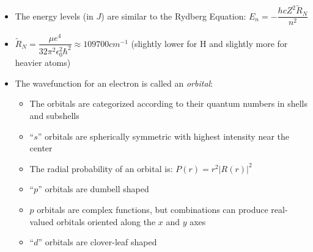 \documentclass[12pt, openany, letterpaper]{memoir}
\begin{document}
\begin{itemize}
\begin{itemize}
	\end{itemize}
	\item The energy levels (in $J$) are similar to the Rydberg Equation: $E_n = -\dfrac{hcZ^2\tilde{R}_N}{n^2}$
	\item $\tilde{R}_N=\dfrac{\mu e^4}{32\pi^2\epsilon_0^2\hbar^2}\approx109700cm^{-1}$ (slightly lower for H and slightly more for heavier atoms)
	\item The wavefunction for an electron is called an \emph{orbital}:
	\begin{itemize}
		\item The orbitals are categorized according to their quantum numbers in shells and subshells
		\item “$s$” orbitals are spherically symmetric with highest intensity near the center
		\item The radial probability of an orbital is: $P(r)=r^2\left|R(r)\right|^2$
		\item “$p$” orbitals are dumbell shaped
		\item $p$ orbitals are complex functions, but combinations can produce real-valued orbitals oriented along the $x$ and $y$ axes
		\item “$d$” orbitals are clover-leaf shaped
	\end{itemize}
\end{itemize}
\end{document}
